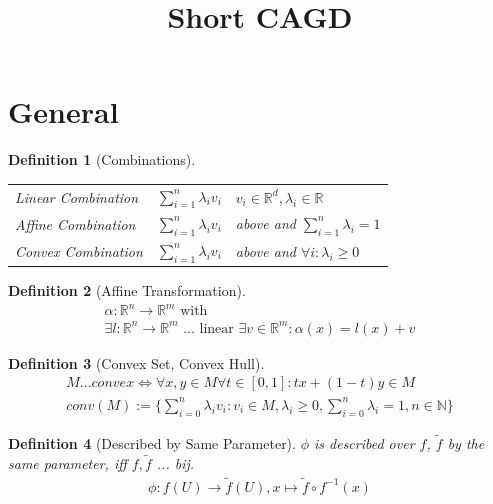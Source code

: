 \documentclass[conference]{IEEEtran}
\newtheorem{definition}{Definition}
\begin{document}
\title{Short CAGD}

\author{}

\maketitle

\section{General}

\begin{definition}[Combinations]
	\hspace{1cm}
	\begin{table}[h!]
		\begin{tabular}{lll}
			Linear Combination & $\sum_{i=1}^{n} \lambda_i v_i$ & $v_i \in \mathbb{R}^d, \lambda_i \in \mathbb{R}$\\
			Affine Combination & $\sum_{i=1}^{n} \lambda_i v_i$ & above and $\sum_{i=1}^{n} \lambda_i = 1$\\
			Convex Combination & $\sum_{i=1}^{n} \lambda_i v_i$ & above and $\forall i: \lambda_i \geq 0$\\
		\end{tabular}
	\end{table}	
\end{definition}

\begin{definition}[Affine Transformation]
	\begin{align*}
		\alpha: \mathbb{R}^n \rightarrow \mathbb{R}^m \text{ with }\\
		\exists l: \mathbb{R}^n \rightarrow \mathbb{R}^m \text{ ... linear } \exists v \in \mathbb{R}^m : \alpha(x) = l(x) + v
	\end{align*}
\end{definition}

\begin{definition}[Convex Set, Convex Hull]
	\begin{align*}
		M ... convex \iff \forall x,y \in M \forall t \in [0, 1] : tx + (1-t)y \in M\\
		conv(M) := \{\sum_{i=0}^{n} \lambda_i v_i: v_i \in M, \lambda_i \geq 0, \sum_{i=0}^{n} \lambda_i = 1, n\in \mathbb{N}\}
	\end{align*}
\end{definition}

\begin{definition}[Described by Same Parameter]
	$\phi$ is described over $f$, $\tilde{f}$ by the same parameter, iff $f,\tilde{f}$ ... bij.
	\begin{align*}
		\phi: f(U) \rightarrow \tilde{f}(U), x \mapsto \tilde{f} \circ f^{-1}(x)
	\end{align*}
\end{definition}
	
\end{document}
